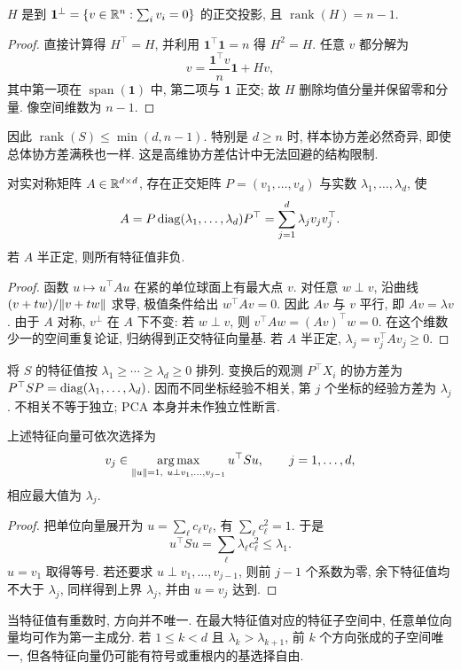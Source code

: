 \begin{proposition}[中心化矩阵]
$H$ 是到 $\mathbf1^\perp=\{v\in\mathbb R^n:\sum_i v_i=0\}$ 的正交投影, 且 $\operatorname{rank}(H)=n-1$. 
\end{proposition}
\begin{proof}
直接计算得 $H^\top=H$, 并利用 $\mathbf1^\top\mathbf1=n$ 得 $H^2=H$. 任意 $v$ 都分解为
\[
 v=\frac{\mathbf1^\top v}{n}\mathbf1+Hv,
\]
其中第一项在 $\operatorname{span}(\mathbf1)$ 中, 第二项与 $\mathbf1$ 正交; 故 $H$ 删除均值分量并保留零和分量. 像空间维数为 $n-1$. 
\end{proof}
因此 $\operatorname{rank}(S)\leq\min(d,n-1)$. 特别是 $d\geq n$ 时, 样本协方差必然奇异, 即使总体协方差满秩也一样. 这是高维协方差估计中无法回避的结构限制. 

\begin{theorem}[实对称矩阵的谱分解]
对实对称矩阵 $A\in\mathbb R^{d\times d}$, 存在正交矩阵 $P=(v_1,\ldots,v_d)$ 与实数 $\lambda_1,\ldots,\lambda_d$, 使
\[
 A=P\operatorname{diag}(\lambda_1,\ldots,\lambda_d)P^\top
   =\sum_{j=1}^d\lambda_jv_jv_j^\top.
\]
若 $A$ 半正定, 则所有特征值非负. 
\end{theorem}
\begin{proof}
函数 $u\mapsto u^\top Au$ 在紧的单位球面上有最大点 $v$. 对任意 $w\perp v$, 沿曲线 $(v+tw)/\lVert v+tw\rVert$ 求导, 极值条件给出 $w^\top Av=0$. 因此 $Av$ 与 $v$ 平行, 即 $Av=\lambda v$. 由于 $A$ 对称, $v^\perp$ 在 $A$ 下不变: 若 $w\perp v$, 则 $v^\top Aw=(Av)^\top w=0$. 在这个维数少一的空间重复论证, 归纳得到正交特征向量基. 若 $A$ 半正定, $\lambda_j=v_j^\top Av_j\geq0$. 
\end{proof}
将 $S$ 的特征值按 $\lambda_1\geq\cdots\geq\lambda_d\geq0$ 排列. 变换后的观测 $P^\top X_i$ 的协方差为 $P^\top SP=\operatorname{diag}(\lambda_1,\ldots,\lambda_d)$. 因而不同坐标经验不相关, 第 $j$ 个坐标的经验方差为 $\lambda_j$. 不相关不等于独立; PCA 本身并未作独立性断言. 

\begin{theorem}[主成分的变分刻画]
上述特征向量可依次选择为
\[
 v_j\in\operatorname*{arg\,max}_{\lVert u\rVert=1,\ u\perp v_1,\ldots,v_{j-1}}u^\top Su,
 \qquad j=1,\ldots,d,
\]
相应最大值为 $\lambda_j$. 
\end{theorem}
\begin{proof}
把单位向量展开为 $u=\sum_\ell c_\ell v_\ell$, 有 $\sum_\ell c_\ell^2=1$. 于是
\[
 u^\top Su=\sum_\ell\lambda_\ell c_\ell^2\leq\lambda_1.
\]
$u=v_1$ 取得等号. 若还要求 $u\perp v_1,\ldots,v_{j-1}$, 则前 $j-1$ 个系数为零, 余下特征值均不大于 $\lambda_j$, 同样得到上界 $\lambda_j$, 并由 $u=v_j$ 达到. 
\end{proof}
当特征值有重数时, 方向并不唯一. 在最大特征值对应的特征子空间中, 任意单位向量均可作为第一主成分. 若 $1\leq k<d$ 且 $\lambda_k>\lambda_{k+1}$, 前 $k$ 个方向张成的子空间唯一, 但各特征向量仍可能有符号或重根内的基选择自由. 

